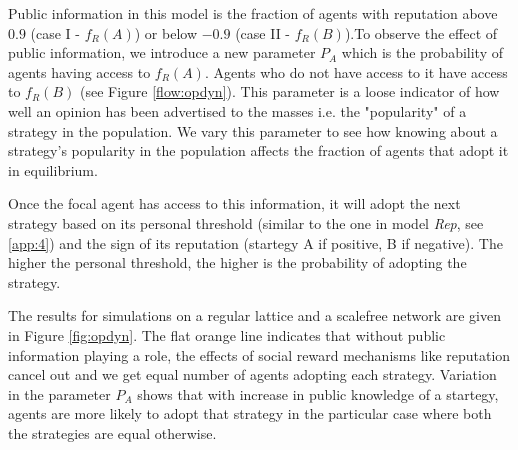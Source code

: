 \documentclass[11pt, A4 paper, twocolumn ]{article}
\begin{document}
 Public information in this model is the fraction of agents with reputation above $0.9 $ (case I - $f_{R}(A) $) or below $ -0.9 $ (case II - $ f_{R}(B) $).To observe the effect of public information, we introduce a new parameter  $ P_{A} $ which is the probability of agents having access to $ f_{R}(A)$. Agents who do not have access to it have access to $ f_{R}(B) $ (see Figure \ref{flow:opdyn}). This parameter is a loose indicator of how well an opinion has been advertised to the masses i.e. the "popularity" of a strategy in the population. We vary this parameter to see how knowing about a strategy's popularity in the population affects the fraction of agents that adopt it in equilibrium. \par 
 Once the focal agent has access to this information, it will adopt the next strategy based on its personal threshold (similar to the one in model \textit{Rep}, see \ref{app:4}) and the sign of its reputation (startegy A if positive, B if negative). The higher the personal threshold, the higher is the probability of adopting the strategy. \par 
 The results for simulations on a regular lattice and a scalefree network are given in Figure \ref{fig:opdyn}. The flat orange line indicates that without public information playing a role, the effects of social reward mechanisms like reputation cancel out and we get equal number of agents adopting each strategy. Variation in the parameter $ P_{A} $ shows that with increase in public knowledge of a startegy, agents are more likely to adopt that strategy in the particular case where both the strategies are equal otherwise. 
 
\end{document}
